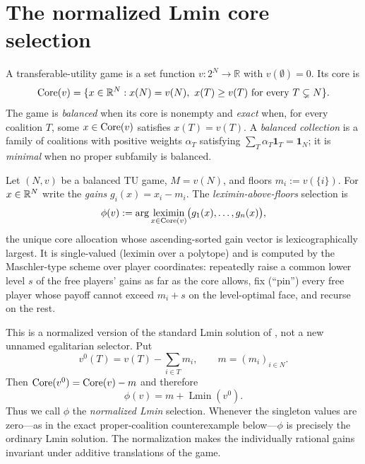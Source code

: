 
\section{The normalized Lmin core selection}\label{sec:lx-def}

\begin{definition}
A transferable-utility game is a set function $v:2^N\to\mathbb R$ with
$v(\emptyset)=0$.  Its core is
\[
 \operatorname{Core}(v)=\{x\in\mathbb R^N:x(N)=v(N),\ x(T)\geq v(T)
                  \text{ for every }T\subsetneq N\}.
\]
The game is \emph{balanced} when its core is nonempty and \emph{exact} when,
for every coalition $T$, some $x\in\operatorname{Core}(v)$ satisfies $x(T)=v(T)$.
A \emph{balanced collection} is a family of coalitions with positive weights
$\alpha_T$ satisfying $\sum_T\alpha_T\mathbf1_T=\mathbf1_N$; it is
\emph{minimal} when no proper subfamily is balanced.
\end{definition}

Let $(N,v)$ be a balanced TU game, $M=v(N)$, and floors $m_i:=v(\{i\})$. For
$x\in\mathbb{R}^N$ write the \emph{gains} $g_i(x)=x_i-m_i$. The
\emph{leximin-above-floors} selection is
\[
  \phi(v):=\arg\operatorname*{leximin}_{x\in\operatorname{Core}(v)}\bigl(g_1(x),\dots,g_n(x)\bigr),
\]
the unique core allocation whose ascending-sorted gain vector is
lexicographically largest. It is single-valued (leximin over a polytope) and is
computed by the Maschler-type scheme over player coordinates: repeatedly raise a
common lower level $s$ of the free players' gains as far as the core allows, fix
(``pin'') every free player whose payoff cannot exceed $m_i+s$ on the level-optimal
face, and recurse on the rest.

This is a normalized version of the standard Lmin solution of
\citet{ArinInarra2001}, not a new unnamed egalitarian selector.  Put
\[
 v^0(T)=v(T)-\sum_{i\in T}m_i,
 \qquad m=(m_i)_{i\in N}.
 \tag{LN}\label{eq:lx-normalized-lmin}
\]
Then $\operatorname{Core}(v^0)=\operatorname{Core}(v)-m$ and therefore
\[
 \phi(v)=m+\operatorname{Lmin}(v^0).              \tag{L0}
\]
Thus we call $\phi$ the \emph{normalized Lmin} selection.  Whenever the
singleton values are zero---as in the exact proper-coalition counterexample
below---$\phi$ is precisely the ordinary Lmin solution.  The normalization
makes the individually rational gains invariant under additive translations
of the game.

